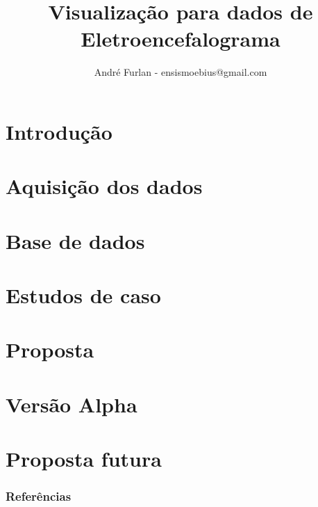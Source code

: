 

\title{Visualização para dados de Eletroencefalograma}


\author{André Furlan - ensismoebius@gmail.com}

\date{\the\year}


	
	\frame{\titlepage}
	
	\section{Introdução}
		
	\section{Aquisição dos dados}
		
	\section{Base de dados}
		
	\section{Estudos de caso}
		
	\section{Proposta}
		
	\section{Versão Alpha}
	\section{Proposta futura}
		
	
	\begin{frame}[allowframebreaks]
		\frametitle{Referências}
		
	\end{frame}
	
